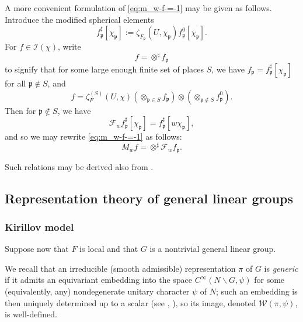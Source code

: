 A more convenient formulation of \eqref{eq:m_w-f-=-1} may be given as follows.  Introduce the modified spherical elements
\begin{equation*}
  f_\mathfrak{p}^\sharp[\chi_\mathfrak{p}] := \zeta_{F_\mathfrak{p}}(U,\chi_\mathfrak{p}) f_\mathfrak{p}^0[\chi_\mathfrak{p}].
\end{equation*}
For $f \in \mathcal{I}(\chi)$, write
\begin{equation*}
  f = \otimes^\sharp f_\mathfrak{p}
\end{equation*}
to signify that for some large enough finite set of places $S$, we have $f_\mathfrak{p} = f_\mathfrak{p} ^\sharp [\chi_\mathfrak{p}]$ for all $\mathfrak{p} \notin S$, and
\begin{equation*}
  f = \zeta_F^{(S)}(U,\chi)
  (\otimes_{\mathfrak{p} \in S} f_\mathfrak{p} )
  \otimes
  (\otimes_{\mathfrak{p} \notin S} f_\mathfrak{p}^0 ).
\end{equation*}
Then for $\mathfrak{p} \notin S$, we have
\begin{equation}\label{eq:normalized-F-w-preserves-basic-vector}
  \mathcal{F}_w f_\mathfrak{p}^\sharp[\chi_\mathfrak{p}] = f_\mathfrak{p} ^\sharp [w \chi_\mathfrak{p}],
\end{equation}
and so we may rewrite \eqref{eq:m_w-f-=-1} as follows:
\begin{equation}\label{eq:m_w-f-=-2}
  M_w f = \otimes^\sharp \mathcal{F}_w f_\mathfrak{p}.
\end{equation}

\begin{remark}
  Such relations may be derived also from \cite[p373]{MR3468638}.
\end{remark}


\subsection{Representation theory of general linear groups}


\subsubsection{Kirillov model}\label{sec:local-prelim-kirillov-model}
Suppose now that $F$ is local and that $G$ is a nontrivial general linear group.

We recall that an irreducible (smooth admissible) representation $\pi$ of $G$ is \emph{generic} if it admits an equivariant embedding into the space $C^\infty(N \backslash G, \psi)$ for some (equivalently, any) nondegenerate unitary character $\psi$ of $N$; such an embedding is then uniquely determined up to a scalar (see \cite{MR348047}, \cite[\S1]{MR546599}), so its image, denoted $\mathcal{W}(\pi,\psi)$, is well-defined.

